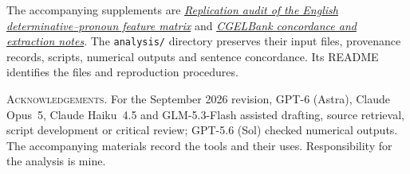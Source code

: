 \documentclass[12pt]{article}
\begin{document}
The accompanying supplements are \href{run:matrix-audit.pdf}{\textit{Replication audit of the English determinative--pronoun feature matrix}} and \href{run:corpus-documentation.pdf}{\textit{CGELBank concordance and extraction notes}}. The \texttt{analysis/} directory preserves their input files, provenance records, scripts, numerical outputs and sentence concordance. Its README identifies the files and reproduction procedures.

\vspace{0.5\baselineskip}
\noindent\textsc{Acknowledgements.} For the September 2026 revision, GPT-6 (Astra), Claude Opus~5, Claude Haiku~4.5 and GLM-5.3-Flash assisted drafting, source retrieval, script development or critical review; GPT-5.6 (Sol) checked numerical outputs. The accompanying materials record the tools and their uses. Responsibility for the analysis is mine.

\clearpage
\printbibliography
\end{document}
